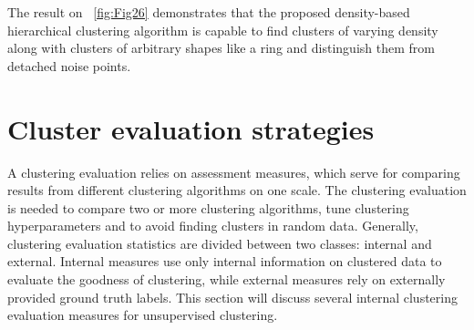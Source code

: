 The result on ~\autoref{fig:Fig26} demonstrates that the proposed density-based hierarchical clustering algorithm is capable to find clusters of varying density along with clusters of arbitrary shapes like a ring and distinguish them from detached noise points.

\section{Cluster evaluation strategies}
\label{Cluster evaluation strategies}
A clustering evaluation relies on assessment measures, which serve for comparing results from different clustering algorithms on one scale. The clustering evaluation is needed to compare two or more clustering algorithms, tune clustering hyperparameters and to avoid finding clusters in random data. Generally, clustering evaluation statistics are divided between two classes: internal and external. Internal measures use only internal information on clustered data to evaluate the goodness of clustering, while external measures rely on externally provided ground truth labels. This section will discuss several internal clustering evaluation measures for unsupervised clustering.


